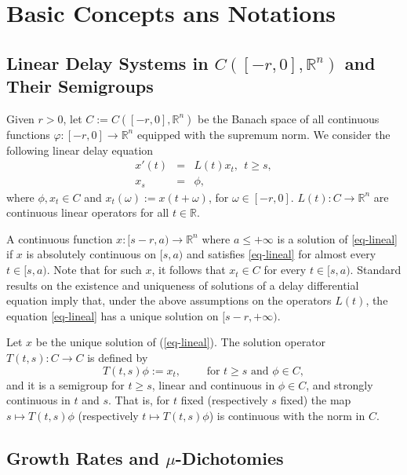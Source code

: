 \documentclass[9pt]{amsart}
\numberwithin{equation}{section}
\numberwithin{lemma}{section}
\begin{document}
\section{Basic Concepts ans Notations}
\subsection{Linear Delay Systems in $C([-r,0],\mathbb{R}^n)$ and Their Semigroups}

Given $r>0$, let $C:=C([-r,0],\mathbb{R}^n)$ be the Banach space of all continuous functions $\varphi:[-r,0]\to\mathbb{R}^n$ equipped with the supremum norm. We consider the following linear delay  equation
\begin{equation}\label{eq-lineal}
\begin{array}{rcl}
  x'(t) &=& L(t)x_t, \ \ t\geq s,\\
  x_s &=& \phi,
\end{array}
\end{equation}
where  $\phi, x_t\in C$ and  $x_t(\omega):=x(t+\omega)$, for  $\omega\in[-r,0]$.   $L(t):C\to \mathbb{R}^n$ are continuous linear operators for all $t\in\mathbb{R}$.

A continuous function $x:[s-r,a)\to \mathbb{R}^n$ where $a\leq+\infty$ is a solution of \eqref{eq-lineal} if $x$ is absolutely continuous on $[s,a)$  and satisfies \eqref{eq-lineal} for almost every $t\in[s,a)$. Note that for such $x$, it follows that $x_t\in C$ for every $t\in[s,a)$.  Standard results on the existence and uniqueness of solutions of a delay differential equation imply that, under the above assumptions on the operators $L(t)$, the equation \eqref{eq-lineal} has a unique solution on $[s-r,+\infty)$.   

Let  $x$ be the unique solution of (\ref{eq-lineal}). The solution operator $T(t,s):C\to C$ is defined by
\begin{equation*}
  T(t,s)\phi:=x_t, \qquad \mbox{ for } t\geq s \mbox{ and } \phi\in C,
\end{equation*}
 and it is a semigroup for $t\geq s$, linear and continuous in $\phi\in C$, and  strongly continuous in $t$ and $s$. That is, for $t$ fixed (respectively $s$ fixed) the map $s\mapsto T(t,s)\phi$ (respectively $t\mapsto T(t,s)\phi$) is continuous with the norm in $C$.

 \subsection{Growth Rates and $\mu$-Dichotomies}
\end{document}
